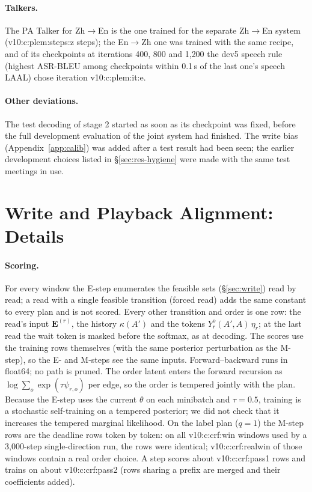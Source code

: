 \paragraph{Talkers.} The PA Talker for Zh$\rightarrow$En is the one trained for the separate Zh$\rightarrow$En system
(\num{v10:c:plem:steps:z} steps); the En$\rightarrow$Zh one was trained with the same recipe, and of its checkpoints at
iterations 400, 800 and 1{,}200 the dev5 speech rule (highest ASR-BLEU among checkpoints within 0.1\,s of the last
one's speech LAAL) chose iteration \num{v10:c:plem:it:e}.

\paragraph{Other deviations.} The test decoding of stage 2 started as soon as its checkpoint was fixed, before the full
development evaluation of the joint system had finished. The write bias (Appendix~\ref{app:calib}) was added after a test
result had been seen; the earlier development choices listed in \S\ref{sec:res-hygiene} were made with the same test
meetings in use.

\section{Write and Playback Alignment: Details}
\label{app:crf}

\paragraph{Scoring.} For every window the E-step enumerates the feasible sets (\S\ref{sec:write}) read by read; a
read with a single feasible transition (forced read) adds the same constant to every plan and is not scored. Every other
transition and order is one row: the read's input $\bm{E}^{(r)}$, the history $\kappa(A')$ and the tokens
$Y_r^o(A',A)\,\eta_r$; at the last read the wait token is masked before the softmax, as at decoding. The scores use the
training rows themselves (with the same posterior perturbation as the M-step), so the E- and M-steps see the same inputs.
Forward--backward runs in float64; no path is pruned. The order latent enters the forward recursion as
$\log\sum_o\exp(\tau\psi_{r,o})$ per edge, so the order is tempered jointly with the plan. Because the E-step uses the
current $\theta$ on each minibatch and $\tau=0.5$, training is a stochastic self-training on a tempered posterior; we did
not check that it increases the tempered marginal likelihood. On the label plan ($q=1$) the M-step rows are the deadline rows
token by token: on all \num{v10:c:crf:win} windows used by a 3{,}000-step single-direction run, the rows were identical;
\num{v10:c:crf:realwin} of those windows contain a real order choice. A step scores about \num{v10:c:crf:pass1} rows
and trains on about \num{v10:c:crf:pass2} (rows sharing a prefix are merged and their coefficients added).

